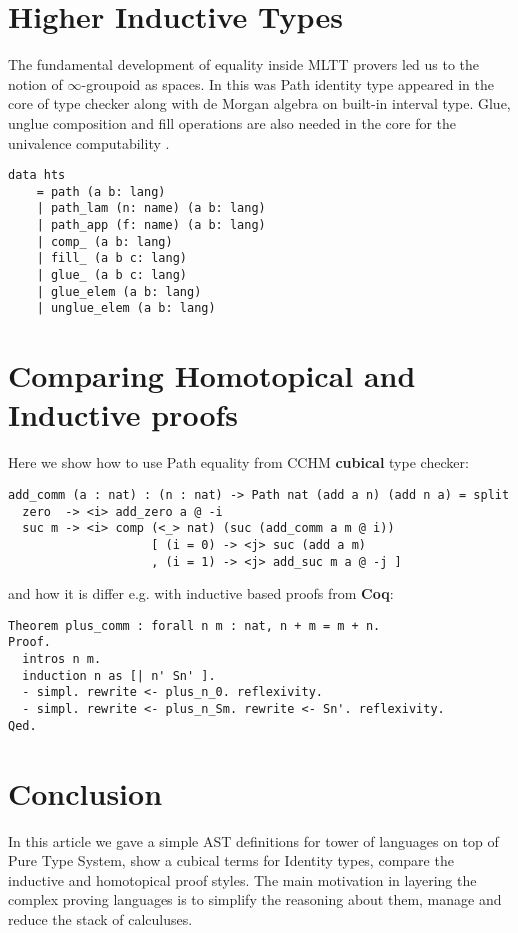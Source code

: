 \section{Higher Inductive Types}

The fundamental development of equality inside MLTT
provers led us to the notion of $\infty$-groupoid \cite{Streicher95} as spaces.
In this was Path identity type appeared in the core
of type checker along with de Morgan algebra on
built-in interval type. Glue, unglue composition
and fill operations are also needed in the core
for the univalence computability \cite{Mortberg17}.

\begin{lstlisting}[mathescape=true]
data hts
    = path (a b: lang)
    | path_lam (n: name) (a b: lang)
    | path_app (f: name) (a b: lang)
    | comp_ (a b: lang)
    | fill_ (a b c: lang)
    | glue_ (a b c: lang)
    | glue_elem (a b: lang)
    | unglue_elem (a b: lang)
\end{lstlisting}

\section{Comparing Homotopical and Inductive proofs}

Here we show how to use Path equality from CCHM {\bf cubical} type checker:

\begin{lstlisting}[mathescape=true]
add_comm (a : nat) : (n : nat) -> Path nat (add a n) (add n a) = split
  zero  -> <i> add_zero a @ -i
  suc m -> <i> comp (<_> nat) (suc (add_comm a m @ i))
                    [ (i = 0) -> <j> suc (add a m)
                    , (i = 1) -> <j> add_suc m a @ -j ]
\end{lstlisting}

and how it is differ e.g. with inductive based proofs from {\bf Coq}:

\begin{lstlisting}[mathescape=true]
Theorem plus_comm : forall n m : nat, n + m = m + n.
Proof.
  intros n m.
  induction n as [| n' Sn' ].
  - simpl. rewrite <- plus_n_0. reflexivity.
  - simpl. rewrite <- plus_n_Sm. rewrite <- Sn'. reflexivity.
Qed.
\end{lstlisting}

\section{Conclusion}
In this article we gave a simple AST definitions for tower of languages
on top of Pure Type System, show a cubical terms for Identity types, compare
the inductive and homotopical proof styles. The main motivation in
layering the complex proving languages is to simplify the reasoning about them,
manage and reduce the stack of calculuses.

